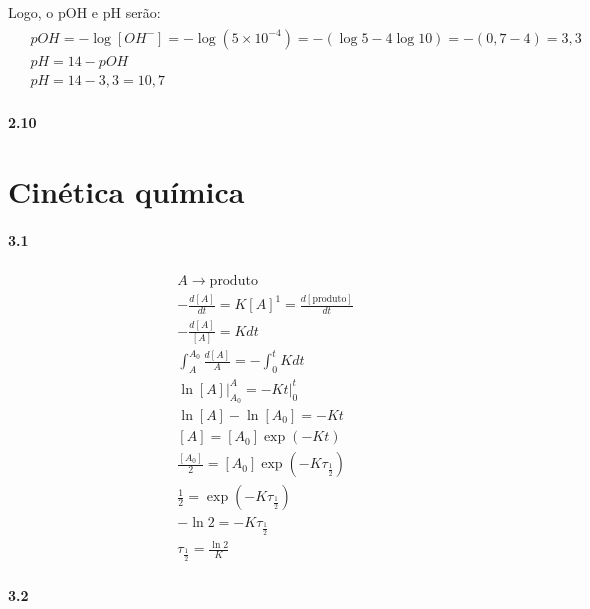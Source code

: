 Logo, o pOH e pH serão:
\begin{gather}
    \begin{align}
        & pOH = -\log [OH^-] = -\log(5 \times 10^{-4}) = - (\log 5 - 4 \log 10) = - (0,7 - 4) = 3,3 \\
        & pH = 14 - pOH \\
        & pH = 14 - 3,3 = 10,7
    \end{align}
\end{gather}

\paragraph*{2.10}

\section*{Cinética química}

\paragraph*{3.1}

\begin{gather}
    \begin{align*}
        & A \rightarrow \text{produto} \\
        & - \frac{d[A]}{dt} = K[A]^1 = \frac{d[\text{produto}]}{dt} \\
        & - \frac{d[A]}{[A]} = Kdt \\
        & \int_{A}^{A_0} \frac{d[A]}{A} = - \int_{0}^{t} K dt \\
        & \ln [A] {|_{A_0}^{A}} = - Kt {|_{0}^t} \\
        & \ln[A] - \ln[A_0] = - Kt \\
        & [A] = [A_0] \exp(-Kt) \\
        & \frac{[A_0]}{2} = [A_0] \exp(-K \tau_{\frac{1}{2}}) \\
        & \frac{1}{2} = \exp(-K \tau_{\frac{1}{2}}) \\
        & -\ln 2 = -K \tau_{\frac{1}{2}} \\
        & \tau_{\frac{1}{2}} = \frac{\ln 2}{K}
    \end{align*}
\end{gather}

\paragraph*{3.2}


